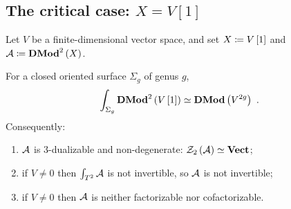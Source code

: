 \subsection{The critical case: \texorpdfstring{$X = V\left[1\right]$}{X = V[1]}}

Let $V$ be a finite-dimensional vector space, and set $X\coloneqq V\left[1\right]$ and
$\mathcal{A} \coloneqq \mathbf{DMod}^2\left(X\right)$.

\begin{theorem}
\label{thm:BW}
For a closed oriented surface $\Sigma_g$ of genus $g$,
\begin{equation*}
\int_{\Sigma_g}\mathbf{DMod}^2\left(V\left[1\right]\right)\simeq\mathbf{DMod}\left(V^{2g}\right) \ .
\end{equation*}
Consequently:
\begin{enumerate}
\item $\mathcal{A}$ is $3$-dualizable and non-degenerate: $\mathcal{Z}_2\left(\mathcal{A}\right)\simeq\mathbf{Vect}$;
\item if $V\neq 0$ then $\int_{T^2}\mathcal{A}$ is not invertible, so $\mathcal{A}$ is not invertible;
\item if $V\neq 0$ then $\mathcal{A}$ is neither factorizable nor cofactorizable.
\end{enumerate}
\end{theorem}

